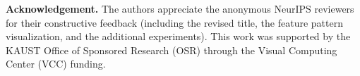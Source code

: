 \documentclass{article}
\newcommand{\mysection}[1]{\vspace{3pt}\noindent\textbf{#1.}}
\begin{document}
\mysection{Acknowledgement}
The authors appreciate the anonymous NeurIPS reviewers for their constructive feedback (including the revised title, the feature pattern visualization, and the additional experiments). This work was supported by the KAUST Office of Sponsored Research (OSR)  through the Visual Computing Center (VCC) funding. {\small


}
\end{document}
